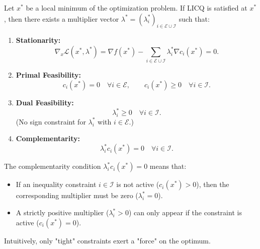 \begin{theoreme}
    Let $x^*$ be a local minimum of the optimization problem. If LICQ is satisfied at $x^*$, then there exists a multiplier vector $\lambda^* = (\lambda_i^*)_{i \in \mathcal{E} \cup \mathcal{I}}$ such that:
    \begin{enumerate}
        \item \textbf{Stationarity:} 
        \begin{equation}
            \nabla_x \mathcal{L}(x^*, \lambda^*) = \nabla f(x^*) - \sum_{i \in \mathcal{E} \cup \mathcal{I}} \lambda_i^* \nabla c_i(x^*) = 0.
        \end{equation}
        
        \item \textbf{Primal Feasibility:}
        \begin{equation}
            c_i(x^*) = 0 \quad \forall i \in \mathcal{E}, \qquad c_i(x^*) \geq 0 \quad \forall i \in \mathcal{I}.
        \end{equation}
        
        \item \textbf{Dual Feasibility:}
        \begin{equation}
            \lambda_i^* \geq 0 \quad \forall i \in \mathcal{I}.
        \end{equation}
        (No sign constraint for $\lambda_i^*$ with $i \in \mathcal{E}$.)
        
        \item \textbf{Complementarity:}
        \begin{equation}
            \lambda_i^* c_i(x^*) = 0 \quad \forall i \in \mathcal{I}.
        \end{equation}
    \end{enumerate}
\end{theoreme}

\begin{remarque}
    The complementarity condition $\lambda_i^* c_i(x^*) = 0$ means that:
    \begin{itemize}
        \item If an inequality constraint $i \in \mathcal{I}$ is not active ($c_i(x^*) > 0$), then the corresponding multiplier must be zero ($\lambda_i^* = 0$).
        \item A strictly positive multiplier ($\lambda_i^* > 0$) can only appear if the constraint is active ($c_i(x^*) = 0$).
    \end{itemize}
    Intuitively, only "tight" constraints exert a "force" on the optimum.
\end{remarque}

